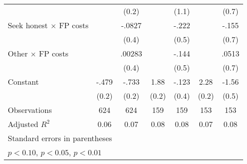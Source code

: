 \begin{table}[htbp]
\begin{tabular}{l*{6}{c}}
                &                  &    (0.2)         &                  &    (1.1)         &                  &    (0.7)         \\
Seek honest $\times$ FP costs&                  &   -.0827         &                  &    -.222         &                  &    -.155         \\
                &                  &    (0.4)         &                  &    (0.5)         &                  &    (0.7)         \\
Other $\times$ FP costs&                  &   .00283         &                  &    -.144         &                  &    .0513         \\
                &                  &    (0.4)         &                  &    (0.5)         &                  &    (0.7)         \\
Constant        &    -.479\sym{***}&    -.733\sym{***}&     1.88\sym{***}&    -.123         &     2.28\sym{***}&    -1.56\sym{***}\\
                &    (0.2)         &    (0.2)         &    (0.2)         &    (0.4)         &    (0.2)         &    (0.5)         \\
\hline
Observations    &      624         &      624         &      159         &      159         &      153         &      153         \\
Adjusted \(R^{2}\)&     0.06         &     0.07         &     0.08         &     0.08         &     0.07         &     0.08         \\
\hline\hline
\multicolumn{7}{l}{\footnotesize Standard errors in parentheses}\\
\multicolumn{7}{l}{\footnotesize \sym{*} \(p<0.10\), \sym{**} \(p<0.05\), \sym{***} \(p<0.01\)}\\
\end{tabular}
\end{table}
